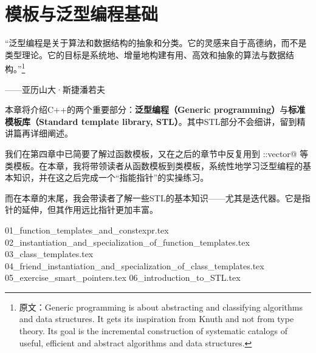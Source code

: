 \chapter{模板与泛型编程基础}
{\kaishu \large ``泛型编程是关于算法和数据结构的抽象和分类。它的灵感来自于高德纳，而不是类型理论。它的目标是系统地、增量地构建有用、高效和抽象的算法与数据结构。''\footnote{原文：Generic programming is about abstracting and classifying algorithms and data structures. It gets its inspiration from Knuth and not from type theory. Its goal is the incremental construction of systematic catalogs of useful, efficient and abstract algorithms and data structures.}}
\begin{flushright}——亚历山大·斯捷潘若夫\end{flushright}\par
本章将介绍C++的两个重要部分：\textbf{泛型编程（Generic programming）}与\textbf{标准模板库（Standard template library, STL）}。其中STL部分不会细讲，留到精讲篇再详细阐述。\par
我们在第四章中已简要了解过函数模板，又在之后的章节中反复用到 \lstinline@std::vector@ 等类模板。在本章，我将带领读者从函数模板到类模板，系统性地学习泛型编程的基本知识，并在这之后完成一个``指能指针''的实操练习。\par
而在本章的末尾，我会带读者了解一些STL的基本知识——尤其是迭代器。它是指针的延伸，但其作用远比指针更加丰富。\par
{01_function_templates_and_constexpr.tex}
{02_instantiation_and_specialization_of_function_templates.tex}
{03_class_templates.tex}
{04_friend_instantiation_and_specialization_of_class_templates.tex}
{05_exercise_smart_pointers.tex}
{06_introduction_to_STL.tex}